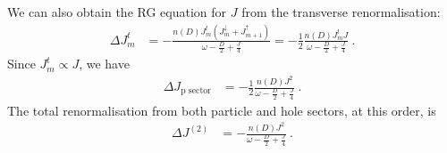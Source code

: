 \documentclass[12pt]{iopart}
\begin{document}
We can also obtain the RG equation for \(J\) from the transverse renormalisation:
\begin{eqnarray}
	\Delta J^t_m &= - \frac{n(D)J^t_m \left( J^\downarrow_m + J^\uparrow_{m+1} \right) }{\omega - \frac{D}{2} + \frac{J}{4}} = -\frac{1}{2}\frac{n(D)J^t_m J}{\omega - \frac{D}{2} + \frac{J}{4}}~.
\end{eqnarray}
Since \(J^t_m \propto J\), we have
\begin{eqnarray}
	\Delta J_\text{p sector} &= -\frac{1}{2}\frac{n(D)J^2}{\omega - \frac{D}{2} + \frac{J}{4}}~.
\end{eqnarray}
The total renormalisation from both particle and hole sectors, at this order, is
\begin{eqnarray}
	\Delta J^{(2)} &= -\frac{n(D)J^2}{\omega - \frac{D}{2} + \frac{J}{4}}~.
\end{eqnarray}
\end{document}
